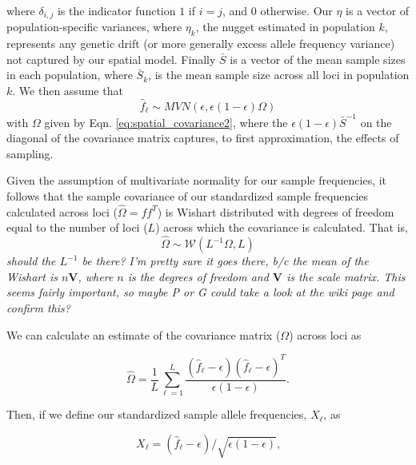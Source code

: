 \documentclass[12pt]{article}
\newcommand{\gb}[1]{{\em \color{magenta} #1}}
\newcommand{\plr}[1]{{\em \color{green} #1}}
\newcommand{\gc}[1]{{\em \color{blue} #1}}
\begin{document}
where $\delta_{i,j}$ is the indicator function $1$ if $i=j$, and $0$ otherwise. Our $\eta$ is a vector of population-specific variances, where $\eta_k$, the nugget estimated in population $k$, represents any genetic drift (or more generally excess allele frequency variance) not captured by our spatial model. Finally $\bar{S}$ is a vector of the mean sample sizes in each population, where $\bar{S}_k$, is the mean sample size across all loci in population $k$.  We then assume that
\begin{equation}
\hat{f}_{\ell} \sim MVN(\epsilon, \epsilon (1-\epsilon)\Omega)
\end{equation}
with $\Omega$ given by Eqn. \eqref{eq:spatial_covariance2},  where the $\epsilon(1-\epsilon)  \bar{S}^{-1}$ on the diagonal of the covariance matrix captures, to first approximation, the effects of sampling.

Given the assumption of multivariate normality for our sample frequencies, it follows that the sample covariance of our standardized sample frequencies calculated across loci ($\widehat{\Omega} = f f^T$)  is Wishart distributed with degrees of freedom equal to the number of loci ($L$) across which the covariance is calculated.
That is, 
\begin{equation}
\label{eq:wishart_dist}
\widehat{\Omega} \sim \mathcal{W}\left( L^{-1} \Omega, L	\right)
\end{equation}
\gc{should the $L^{-1}$ be there?} \gb{I'm pretty sure it goes there, b/c the mean of the Wishart is $n\textbf{V}$, where $n$ is the degrees of freedom and $\textbf{V}$ is the scale matrix.  This seems fairly important, so maybe \plr{P} or \gc{G} could take a look at the wiki page and confirm this?} 

We can calculate an estimate of the covariance matrix ($\Omega$) across loci as 

\begin{equation}
\label{eq:sample_cov}
\widehat{\Omega} = \frac{1}{L} \sum_{\ell=1}^{L} \frac{(\hat{f}_{\ell}  - \epsilon) (\hat{f}_{\ell}  - \epsilon)^T}{\epsilon(1-\epsilon)} \text{.}
\end{equation}

Then, if we define our standardized sample allele frequencies, $X_\ell$, as

\begin{equation}
\label{eq:standardized_sample_freqs}
X_\ell = (\hat{f}_{\ell}  - \epsilon)/\sqrt{\epsilon(1-\epsilon)}\text{,}
\end{equation}
\end{document}
